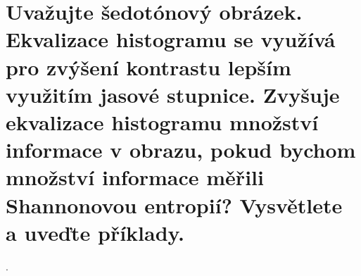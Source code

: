 \section{Uvažujte šedotónový obrázek. Ekvalizace histogramu se využívá pro zvýšení kontrastu lepším využitím jasové 
stupnice. Zvyšuje ekvalizace histogramu množství informace v obrazu, pokud bychom množství informace měřili Shannonovou 
entropií? Vysvětlete a uveďte příklady.}.